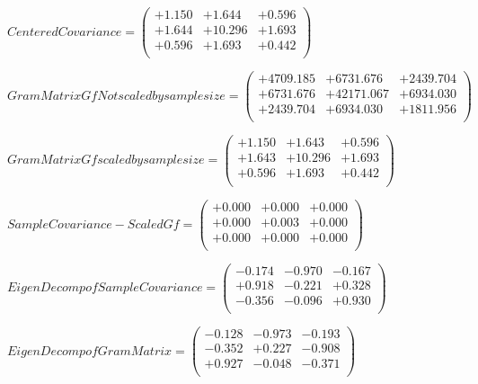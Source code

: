 \documentclass[9pt]{article}
\theoremstyle{plain}
\theoremstyle{definition}
\theoremstyle{remark}
\numberwithin{equation}{section}
\begin{document}
$Centered Covariance = \left(
\begin{array}{
ccc}
+1.150 & +1.644 & +0.596 \\
+1.644 & +10.296 & +1.693 \\
+0.596 & +1.693 & +0.442 \\
\end{array}
\right)$ \newline 

$Gram Matrix Gf Not scaled by sample size = \left(
\begin{array}{
ccc}
+4709.185 & +6731.676 & +2439.704 \\
+6731.676 & +42171.067 & +6934.030 \\
+2439.704 & +6934.030 & +1811.956 \\
\end{array}
\right)$ \newline 

$Gram Matrix Gf  scaled by sample size = \left(
\begin{array}{
ccc}
+1.150 & +1.643 & +0.596 \\
+1.643 & +10.296 & +1.693 \\
+0.596 & +1.693 & +0.442 \\
\end{array}
\right)$ \newline 

$SampleCovariance - Scaled Gf = \left(
\begin{array}{
ccc}
+0.000 & +0.000 & +0.000 \\
+0.000 & +0.003 & +0.000 \\
+0.000 & +0.000 & +0.000 \\
\end{array}
\right)$ \newline 

$EigenDecomp of SampleCovariance = \left(
\begin{array}{
ccc}
-0.174 & -0.970 & -0.167 \\
+0.918 & -0.221 & +0.328 \\
-0.356 & -0.096 & +0.930 \\
\end{array}
\right)$ \newline 

$EigenDecomp of Gram Matrix = \left(
\begin{array}{
ccc}
-0.128 & -0.973 & -0.193 \\
-0.352 & +0.227 & -0.908 \\
+0.927 & -0.048 & -0.371 \\
\end{array}
\right)$ \newline 
\end{document}
